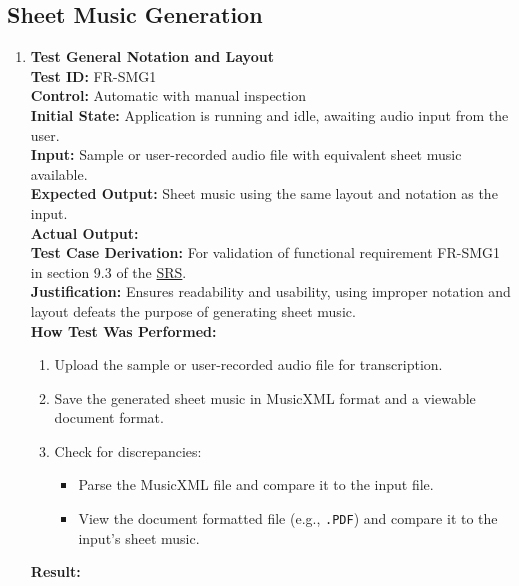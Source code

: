 \documentclass[12pt, titlepage]{article}
\begin{document}
  \subsection{Sheet Music Generation}
  \begin{enumerate}
  \item \textbf{Test General Notation and Layout} \\
    \newline
    \textbf{Test ID:} FR-SMG1 \\
    \textbf{Control:} Automatic with manual inspection \\
    \textbf{Initial State:} Application is running and idle, awaiting audio input from the user. \\
    \textbf{Input:} Sample or user-recorded audio file with equivalent sheet music available. \\
    \textbf{Expected Output:} Sheet music using the same layout and notation as the input. \\
    \textbf{Actual Output:} \\
    \textbf{Test Case Derivation:} For validation of functional requirement FR-SMG1 in section 9.3 of the 
    \href{https://github.com/emilyperica/ScoreGen/blob/main/docs/SRS-Volere/SRS.pdf}{SRS}. \\
    \textbf{Justification:} Ensures readability and usability, using improper notation and layout defeats the purpose of 
    generating sheet music. \\
    \textbf{How Test Was Performed:}
    \begin{enumerate}
        \item Upload the sample or user-recorded audio file for transcription.
        \item Save the generated sheet music in MusicXML format and a viewable document format.
        \item Check for discrepancies:
        \begin{itemize}
            \item Parse the MusicXML file and compare it to the input file.
            \item View the document formatted file (e.g., \texttt{.PDF}) and compare it to the input’s sheet music.
        \end{itemize}
    \end{enumerate}
    \textbf{Result:}
  

\end{enumerate}
\end{document}
